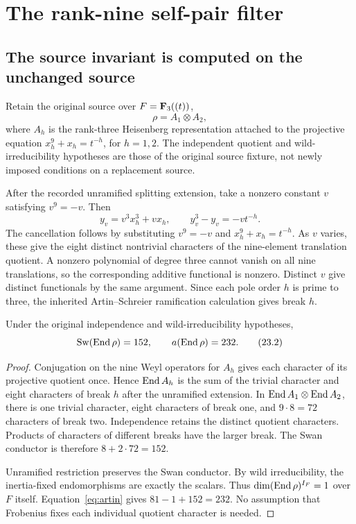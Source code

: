 \section{The rank-nine self-pair filter}\label{sec:ranknine}
\subsection{The source invariant is computed on the unchanged source}
Retain the original source over $F=\mathbf F_3((t))$,
\[
 \rho=A_1\otimes A_2,
\]
where $A_h$ is the rank-three Heisenberg representation attached to the projective equation $x_h^9+x_h=t^{-h}$, for $h=1,2$. The independent quotient and wild-irreducibility hypotheses are those of the original source fixture, not newly imposed conditions on a replacement source.

After the recorded unramified splitting extension, take a nonzero constant $v$ satisfying $v^9=-v$. Then
\[
 y_v=v^3x_h^3+vx_h,
 \qquad y_v^3-y_v=-v t^{-h}.
 \tag{23.1}\label{eq:aschar}
\]
The cancellation follows by substituting $v^9=-v$ and $x_h^9+x_h=t^{-h}$. As $v$ varies, these give the eight distinct nontrivial characters of the nine-element translation quotient. A nonzero polynomial of degree three cannot vanish on all nine translations, so the corresponding additive functional is nonzero. Distinct $v$ give distinct functionals by the same argument. Since each pole order $h$ is prime to three, the inherited Artin--Schreier ramification calculation gives break $h$.

\begin{proposition}\label{prop:end-source}
Under the original independence and wild-irreducibility hypotheses,
\[
 \operatorname{Sw}(\operatorname{End}\rho)=152,
 \qquad a(\operatorname{End}\rho)=232.
 \tag{23.2}\label{eq:source232}
\]
\end{proposition}
\begin{proof}
Conjugation on the nine Weyl operators for $A_h$ gives each character of its projective quotient once. Hence $\operatorname{End} A_h$ is the sum of the trivial character and eight characters of break $h$ after the unramified extension. In $\operatorname{End} A_1\otimes\operatorname{End} A_2$, there is one trivial character, eight characters of break one, and $9\cdot8=72$ characters of break two. Independence retains the distinct quotient characters. Products of characters of different breaks have the larger break. The Swan conductor is therefore $8+2\cdot72=152$.

Unramified restriction preserves the Swan conductor. By wild irreducibility, the inertia-fixed endomorphisms are exactly the scalars. Thus $\dim(\operatorname{End}\rho)^{I_F}=1$ over $F$ itself. Equation~\eqref{eq:artin} gives $81-1+152=232$. No assumption that Frobenius fixes each individual quotient character is needed.
\end{proof}

